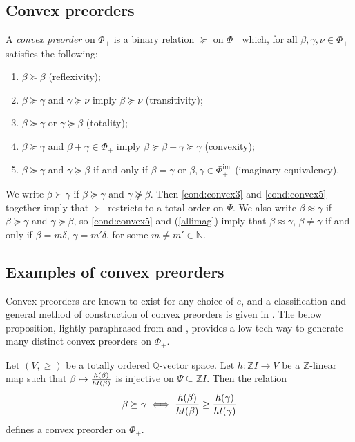 \documentclass[Unicode,ALCO]{cedram}
\newcommand{\im}{\operatorname{im}}
\newcommand{\0}{{\bar 0}}
\newcommand{\Q}{{\mathbb Q}}
\newcommand{\ZZ}{{\mathbb Z}}
\newcommand{\NN}{{\mathbb N}}
\def\im{{\mathrm{im}\,}}
\begin{document}
\subsection{Convex preorders}
A {\em convex preorder} on \(\Phi_+\) is a binary relation \(\succeq\) on \(\Phi_+\) which, for all \(\beta, \gamma, \nu \in \Phi_+\) satisfies the following:
\begin{enumerate}
\item \(\beta \succeq \beta\) (reflexivity); \label{cond:convex1}
\item \(\beta \succeq \gamma\) and \(\gamma \succeq \nu\) imply \(\beta \succeq \nu\) (transitivity); \label{cond:convex2}
\item \(\beta \succeq \gamma\) or \(\gamma \succeq \beta\) (totality); \label{cond:convex3}
\item \(\beta \succeq \gamma\) and \(\beta + \gamma \in \Phi_+\) imply \(\beta \succeq \beta  + \gamma \succeq \gamma\) (convexity); \label{cond:convex4}
\item \(\beta \succeq \gamma\) and \(\gamma \succeq \beta\) if and only if \(\beta = \gamma\) or \(\beta, \gamma \in \Phi_+^\im\) (imaginary equivalency). \label{cond:convex5}
\end{enumerate}
We write \(\beta \succ \gamma\) if \(\beta \succeq \gamma\) and \(\gamma \not \succeq \beta\). Then \eqref{cond:convex3} and \eqref{cond:convex5} together imply that \(\succ\) restricts to a total order on \(\Psi\). We also write \(\beta \approx \gamma\) if \(\beta \succeq \gamma\) and \(\gamma \succeq \beta\), so \eqref{cond:convex5} and (\ref{allimag}) imply that \(\beta \approx \gamma\), \(\beta \neq \gamma\) if and only if \(\beta = m \delta\), \(\gamma = m'\delta\), for some \(m \neq m' \in \NN\). 

\subsection{Examples of convex preorders}
Convex preorders are known to exist for any choice of \(e\), and a classification and general method of construction of convex preorders is given in \cite{ItoClass}. The below proposition, lightly paraphrased from \cite[Example~2.14(ii)]{BaKaTiAffMir} and \cite[Example 3.5]{McNRepKLR3}, provides a low-tech way to generate many distinct convex preorders on \(\Phi_+\).

\begin{prop}\label{genconvex} 
Let \((V, \geq)\) be a totally ordered \(\Q\)-vector space. Let \(h:\ZZ I \to V\) be a \(\ZZ\)-linear map such that \(\beta \mapsto  \frac{h(\beta)}{\textup{ht}(\beta)} \) is injective on \(\Psi \subseteq \ZZ I\). Then the relation 
\begin{align*}
\beta \succeq \gamma \iff \frac{h(\beta)}{\textup{ht}(\beta)} \geq \frac{h(\gamma)}{\textup{ht}(\gamma)}
\end{align*}
defines a convex preorder on \(\Phi_+\).
\end{prop}
\end{document}
